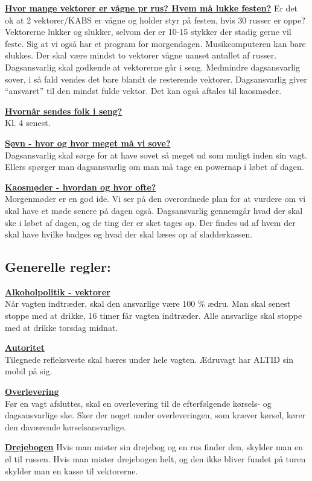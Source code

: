 \underline{\textbf{Hvor mange vektorer er vågne pr rus? Hvem må lukke festen?}}
Er det ok at 2 vektorer/KABS er vågne og holder styr på festen, hvis 30 russer er oppe?\\
Vektorerne lukker og slukker, selvom der er 10-15 stykker der stadig gerne vil feste. Sig at vi også har et program for morgendagen. Musikcomputeren kan bare slukkes. Der skal være mindst to vektorer vågne uanset antallet af russer. Dagsansvarlig skal godkende at vektorerne går i seng. Medmindre dagsansvarlig sover, i så fald vendes det bare blandt de resterende vektorer. Dagsansvarlig giver ``ansvaret'' til den mindst fulde vektor. Det kan også aftales til kaosmøder. 

\underline{\textbf{Hvornår sendes folk i seng?}}\\
Kl. 4 senest. 

\underline{\textbf{Søvn - hvor og hvor meget må vi sove?}}\\
Dagsansvarlig skal sørge for at have sovet så meget ud som muligt inden sin vagt. Ellers spørger man dagsansvarlig om man må tage en powernap i løbet af dagen. 

\underline{\textbf{Kaosmøder - hvordan og hvor ofte?}}\\
Morgenmøder er en god ide. Vi ser på den overordnede plan for at vurdere om vi skal have et møde senere på dagen også. Dagsansvarlig gennemgår hvad der skal ske i løbet af dagen, og de ting der er sket tages op. Der findes ud af hvem der skal have hvilke badges og hvad der skal læses op af sladderkassen. 

\subsection*{Generelle regler:}

\underline{\textbf{Alkoholpolitik - vektorer}}\\
Når vagten indtræder, skal den ansvarlige være 100 \% ædru. Man skal senest
stoppe med at drikke, 16 timer får vagten indtræder. Alle ansvarlige skal
stoppe med at drikke torsdag midnat.

\underline{\textbf{Autoritet}}\\
Tilegnede refleksveste skal bæres under hele vagten. Ædruvagt har ALTID sin
mobil på sig.

\underline{\textbf{Overlevering}}\\
Før en vagt afsluttes, skal en overlevering til de efterfølgende kørsels- og
dagsansvarlige ske. Sker der noget under overleveringen, som kræver kørsel,
kører den daværende kørselsansvarlige.

\underline{\textbf{Drejebogen}}
Hvis man mister sin drejebog og en rus finder den, skylder man en øl til
russen. Hvis man mister drejebogen helt, og den ikke bliver fundet på turen
skylder man en kasse til vektorerne. 

